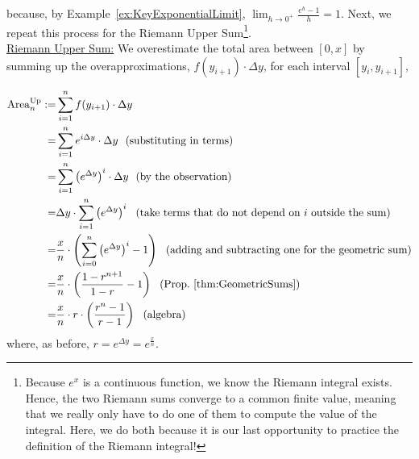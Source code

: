 because, by Example~\ref{ex:KeyExponentialLimit}, $ \displaystyle \lim_{h \to 0^+}  \frac{e^{ h} -1}{h} =1$. Next, we repeat this process for the Riemann Upper Sum\footnote{Because $e^x$ is a continuous function, we know the Riemann integral exists. Hence, the two Riemann sums converge to a common finite value, meaning that we really only have to do one of them to compute the value of the integral. Here, we do both because it is our last opportunity to practice the definition of the Riemann integral!}.\\



\underline{Riemann Upper Sum:} We overestimate the  total area between $[0, x]$ by summing up the overapproximations, $f(y_{i+1})\cdot \Delta y$, for each interval $[y_i, y_{i+1}]$,

        \begin{equation}
        \begin{aligned}
            {\rm Area}^{\rm Up}_n : =& \sum_{i=1}^n f(y_{i+1})\cdot \Delta y \\
            =& \sum_{i=1}^n e^{i \Delta y} \cdot \Delta y ~~(\text{substituting in terms})\\
            =&  \sum_{i=1}^n   \left( e^{\Delta y} \right)^{i}\cdot \Delta y ~~(\text{by the observation})\\
            =& \Delta y\cdot \sum_{i=1}^n   \left( e^{\Delta y} \right)^{i} ~~(\text{take terms that do not depend on $i$ outside the sum})\\
            =&  \frac{x}{n} \cdot \left( \sum_{i=0}^{n}   \left( e^{\Delta y} \right)^{i} -1 \right) ~~(\text{adding and subtracting one for the geometric sum}) \\
            =& \frac{x}{n}\cdot \left( \frac{1 - r^{n+1}}{1-r}   - 1\right) ~~({\rm Prop}.~\ref{thm:GeometricSums}) \\
            =& \frac{x}{n}\cdot r \cdot \left( \frac{r^{n} -1}{r-1} \right) ~~(\text{algebra})
        \end{aligned}            
        \end{equation}
where, as before, $r=  e^{\Delta y} = e^{\frac{x}{n}}$. \\

